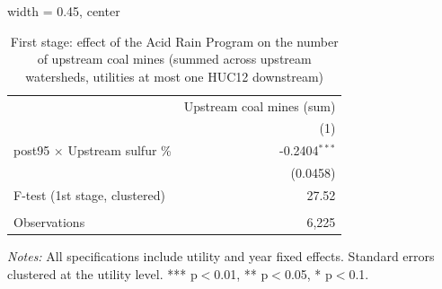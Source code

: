 
\begin{table}[htbp]
   
   \caption{\label{tab:fs_dwnstrm_minevio_ivsum} First stage: effect of the Acid Rain Program on the number of upstream coal mines (summed across upstream watersheds, utilities at most one HUC12 downstream)}
   \bigskip
   
   \centering
   
   \begin{adjustbox}{width = 0.45\textwidth, center}
      
      
      \begin{tabular}{lr}
         \toprule
         
                                              & Upstream coal mines (sum)\\  
         
                                              & (1)\\  
         
         \midrule 
         post95 $\times$ Upstream sulfur \%   & -0.2404$^{***}$\\   
                                              & (0.0458)\\   
         
         F-test (1st stage, clustered)        & 27.52\\  
         
          \\
         
         Observations                         & 6,225\\  
         
         \bottomrule
         
      \end{tabular}
      
      
      
   \end{adjustbox}
      {\tiny\linespread{1}\selectfont \par \raggedright 
   \textit{Notes:} All specifications include utility and year fixed effects. Standard errors clustered at the utility level. *** p$<$0.01, ** p$<$0.05, * p$<$0.1.}
   
\end{table}


